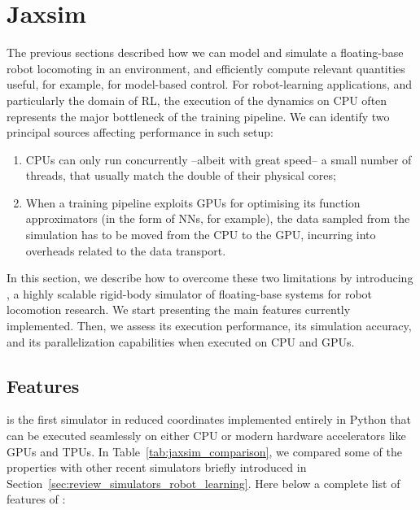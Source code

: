 \pagebreak
\section{Jaxsim}
\label{section:jaxsim}

The previous sections described how we can model and simulate a floating-base robot locomoting in an environment, and efficiently compute relevant quantities useful, for example, for model-based control.
For robot-learning applications, and particularly the domain of \ac{RL}, the execution of the dynamics on \ac{CPU} often represents the major bottleneck of the training pipeline.
We can identify two principal sources affecting performance in such setup:

\begin{enumerate}
    \item \acp{CPU} can only run concurrently --albeit with great speed-- a small number of threads, that usually match the double of their physical cores;
    \item When a training pipeline exploits \acp{GPU} for optimising its function approximators (in the form of \acp{NN}, for example), the data sampled from the simulation has to be moved from the \ac{CPU} to the \ac{GPU}, incurring into overheads related to the data transport.
\end{enumerate}

In this section, we describe how to overcome these two limitations by introducing \jaxsim, a highly scalable rigid-body simulator of floating-base systems for robot locomotion research.
We start presenting the main features currently implemented.
Then, we assess its execution performance, its simulation accuracy, and its parallelization capabilities when executed on \ac{CPU} and \acp{GPU}.

\subsection{Features}

\jaxsim is the first simulator in reduced coordinates implemented entirely in Python that can be executed seamlessly on either \ac{CPU} or modern hardware accelerators like \acp{GPU} and \acp{TPU}.
In Table~\ref{tab:jaxsim_comparison}, we compared some of the \jaxsim properties with other recent simulators briefly introduced in Section~\ref{sec:review_simulators_robot_learning}.
Here below a complete list of features of \jaxsim:

